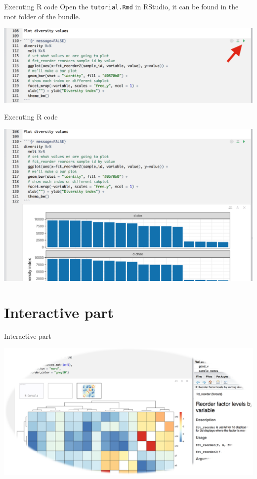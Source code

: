 \documentclass[12pt]{beamer}
\begin{document}
\begin{frame}{Executing R code}
Open the \texttt{tutorial.Rmd} in RStudio, it can be found in the root folder of the bundle.
\begin{center}
\includegraphics[width=\textwidth]{p8}
\end{center}
\end{frame}

\begin{frame}{Executing R code}
\begin{center}
\includegraphics[width=\textwidth]{p9}
\end{center}
\end{frame}

\section{Interactive part}

\begin{frame}{Interactive part}
\begin{center}
\includegraphics[width=\textwidth]{../splash}
\end{center}
\end{frame}
\end{document}
